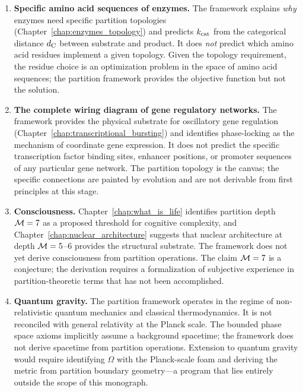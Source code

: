 \begin{enumerate}[label=\textbf{\arabic*.}]
  \item \textbf{Specific amino acid sequences of enzymes.}
        The framework explains \emph{why} enzymes need specific partition
        topologies (Chapter~\ref{chap:enzymes_topology}) and predicts
        $k_{\mathrm{cat}}$ from the categorical distance $d_{\mathrm{C}}$ between substrate and
        product. It does \emph{not} predict which amino acid residues implement
        a given topology. Given the topology requirement, the residue choice
        is an optimization problem in the space of amino acid sequences;
        the partition framework provides the objective function but not the
        solution.

  \item \textbf{The complete wiring diagram of gene regulatory networks.}
        The framework provides the physical substrate for oscillatory gene
        regulation (Chapter~\ref{chap:transcriptional_bursting}) and identifies
        phase-locking as the mechanism of coordinate gene expression. It does
        not predict the specific transcription factor binding sites, enhancer
        positions, or promoter sequences of any particular gene network. The
        partition topology is the canvas; the specific connections are painted
        by evolution and are not derivable from first principles at this stage.

  \item \textbf{Consciousness.}
        Chapter~\ref{chap:what_is_life} identifies partition depth $\mathcal{M} = 7$
        as a proposed threshold for cognitive complexity, and
        Chapter~\ref{chap:nuclear_architecture} suggests that nuclear architecture
        at depth $\mathcal{M} = 5$--$6$ provides the structural substrate.
        The framework does not yet derive consciousness from partition operations.
        The claim $\mathcal{M} = 7$ is a conjecture; the derivation requires a
        formalization of subjective experience in partition-theoretic terms that
        has not been accomplished.

  \item \textbf{Quantum gravity.}
        The partition framework operates in the regime of non-relativistic
        quantum mechanics and classical thermodynamics. It is not reconciled
        with general relativity at the Planck scale. The bounded phase space
        axioms implicitly assume a background spacetime; the framework does not
        derive spacetime from partition operations. Extension to quantum gravity
        would require identifying $\Omega$ with the Planck-scale foam and
        deriving the metric from partition boundary geometry---a program that
        lies entirely outside the scope of this monograph.
\end{enumerate}

